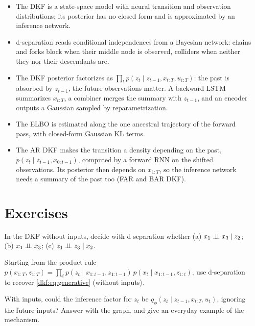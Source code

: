\begin{notechapter}
\begin{chaptersummary}
\begin{itemize}
  \item The DKF is a state-space model with neural transition and observation distributions;
        its posterior has no closed form and is approximated by an inference network.
  \item d-separation reads conditional independences from a Bayesian network: chains and forks
        block when their middle node is observed, colliders when neither they nor their
        descendants are.
  \item The DKF posterior factorizes as $\prod_tp(z_t\mid z_{t-1}, x_{t:T}, u_{t:T})$: the past is absorbed by $z_{t-1}$, the future
        observations matter. A backward LSTM summarizes $x_{t:T}$, a combiner merges the summary with
        $z_{t-1}$, and an encoder outputs a Gaussian sampled by reparametrization.
  \item The ELBO is estimated along the one ancestral trajectory of the forward pass, with
        closed-form Gaussian KL terms.
  \item The AR DKF makes the transition a density depending on the past, $p(z_t\mid z_{t-1}, x_{0:t-1})$, computed by a
        forward RNN on the shifted observations. Its posterior then depends on $x_{1:T}$, so the inference
        network needs a summary of the past too (FAR and BAR DKF).
\end{itemize}
\end{chaptersummary}

\section*{Exercises}

\begin{exercise}\label{dkf:exr:1}
In the DKF without inputs, decide with d-separation whether (a) $x_1\mathrel{\perp\!\!\!\perp} x_3\mid z_2$; (b) $x_1\mathrel{\perp\!\!\!\perp} x_3$;
(c) $z_1\mathrel{\perp\!\!\!\perp} z_3\mid x_2$.
\end{exercise}

\begin{exercise}\label{dkf:exr:2}
Starting from the product rule
$p(x_{1:T}, z_{1:T}) = \prod_tp(z_t\mid x_{1:t-1}, z_{1:t-1})\,p(x_t\mid x_{1:t-1}, z_{1:t})$, use d-separation to recover \cref{dkf:eq:generative}
(without inputs).
\end{exercise}

\begin{exercise}\label{dkf:exr:3}
With inputs, could the inference factor for $z_t$ be $q_\phi(z_t\mid z_{t-1}, x_{t:T}, u_t)$, ignoring the future inputs?
Answer with the graph, and give an everyday example of the mechanism.
\end{exercise}


\end{notechapter}
